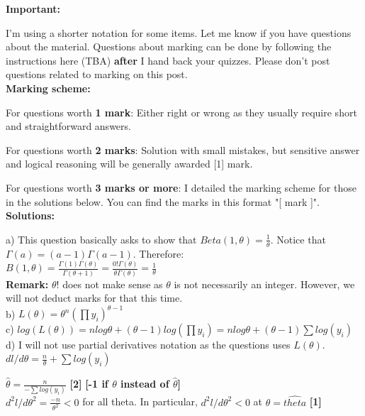 \documentclass[20pt]{report}
\newcommand{\g}{\Gamma}
\begin{document}
\textbf{Important:}

I'm using a shorter notation for some items. Let me know if you have questions about the material. Questions about marking can be done by following the instructions here (TBA) \textbf{after} I hand back your quizzes. Please don't post questions related to marking on this post. \\

\textbf{Marking scheme:}

For questions worth \textbf{1 mark}: Either right or wrong as they usually require short and straightforward answers.

For questions worth \textbf{2 marks}: Solution with small mistakes, but sensitive answer and logical reasoning will be generally awarded [1] mark.

For questions worth \textbf{3 marks or more}: I detailed the marking scheme for those in the solutions below. You can find the marks in this format "[ mark ]".\\



\textbf{Solutions:}

a) This question basically asks to show that $Beta(1,\theta) = \frac{1}{\theta} $. Notice that
$ \Gamma(a) = (a-1)\Gamma(a-1) $. Therefore: \\

$ B(1, \theta) = \frac{\Gamma(1)\Gamma(\theta)}{\g(\theta + 1)} = \frac{0!\g(\theta)}{\theta\g(\theta)} = \frac{1}{\theta}
$ \\

\textbf{Remark: }$\theta!$ does not make sense as $\theta$ is not necessarily an integer. However, we will not deduct marks for that this time. \\


b)
$ 
L(\theta) = \theta^n (\prod y_i)^{\theta-1} 
$\\

c) 
$
log(L(\theta)) = nlog{\theta} + (\theta-1)log(\prod y_i) = 
nlog{\theta} + (\theta-1)\sum log(y_i)
$ \\

d) I will not use partial derivatives notation as the questions uses $L(\theta)$.
$
dl/d\theta = \frac {n}{\theta} + \sum log(y_i)
$

$
\hat{\theta} = \frac{n}{- \sum log(y_i)}
$ \textbf{[2]}\textbf{ [-1 if $\theta$ instead of $\hat{\theta}$] }\\

$
d^2l/d\theta^2 = \frac{-n}{\theta^2} <0
$ for all theta. In particular, $d^2l/d\theta^2 < 0$ at $\theta = \hat{theta} $ \textbf{[1] }\\
\end{document}
